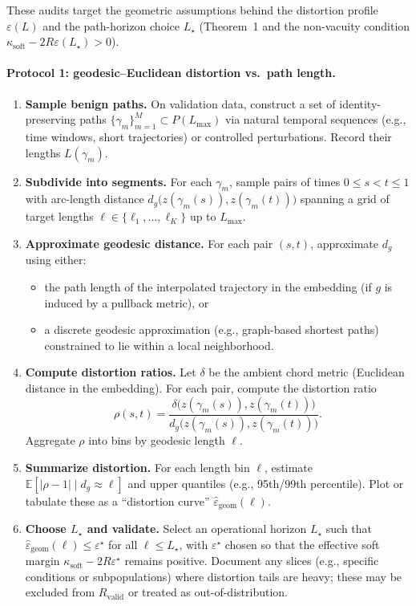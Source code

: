 \documentclass[11pt]{article}
\begin{document}
These audits target the geometric assumptions behind the distortion profile
$\varepsilon(L)$ and the path-horizon choice $L_\star$ (Theorem~1 and the
non-vacuity condition $\kappa_{\mathrm{soft}} - 2R\varepsilon(L_\star) > 0$).

\paragraph{Protocol 1: geodesic–Euclidean distortion vs.~path length.}

\begin{enumerate}[label=(\arabic*)]
\item \textbf{Sample benign paths.} On validation data, construct a set of
  identity-preserving paths $\{\gamma_m\}_{m=1}^M \subset P(L_{\max})$ via
  natural temporal sequences (e.g., time windows, short trajectories) or
  controlled perturbations. Record their lengths $L(\gamma_m)$.
\item \textbf{Subdivide into segments.} For each $\gamma_m$, sample pairs
  of times $0 \le s < t \le 1$ with arc-length distance
  $d_g\bigl(z(\gamma_m(s)), z(\gamma_m(t))\bigr)$ spanning a grid of target
  lengths $\ell \in \{\ell_1,\dots,\ell_K\}$ up to $L_{\max}$.
\item \textbf{Approximate geodesic distance.} For each pair $(s,t)$, approximate
  $d_g$ using either:
  \begin{itemize}
  \item the path length of the interpolated trajectory in the embedding
        (if $g$ is induced by a pullback metric), or
  \item a discrete geodesic approximation (e.g., graph-based shortest paths)
        constrained to lie within a local neighborhood.
  \end{itemize}
\item \textbf{Compute distortion ratios.} Let $\delta$ be the ambient
  chord metric (Euclidean distance in the embedding). For each pair, compute
  the distortion ratio
  \[
  \rho(s,t)
  = \frac{\delta\bigl(z(\gamma_m(s)), z(\gamma_m(t))\bigr)}
         {d_g\bigl(z(\gamma_m(s)), z(\gamma_m(t))\bigr)}.
  \]
  Aggregate $\rho$ into bins by geodesic length $\ell$.
\item \textbf{Summarize distortion.} For each length bin $\ell$, estimate
  $\mathbb{E}[|\rho-1|\mid d_g \approx \ell]$ and upper quantiles
  (e.g., 95th/99th percentile). Plot or tabulate these as a ``distortion curve''
  $\widehat{\varepsilon}_{\mathrm{geom}}(\ell)$.
\item \textbf{Choose $L_\star$ and validate.} Select an operational horizon
  $L_\star$ such that $\widehat{\varepsilon}_{\mathrm{geom}}(\ell) \le \varepsilon^\star$
  for all $\ell \le L_\star$, with $\varepsilon^\star$ chosen so that the effective
  soft margin $\kappa_{\mathrm{soft}} - 2R\varepsilon^\star$ remains positive.
  Document any slices (e.g., specific conditions or subpopulations) where
  distortion tails are heavy; these may be excluded from $R_{\mathrm{valid}}$
  or treated as out-of-distribution.
\end{enumerate}
\end{document}
